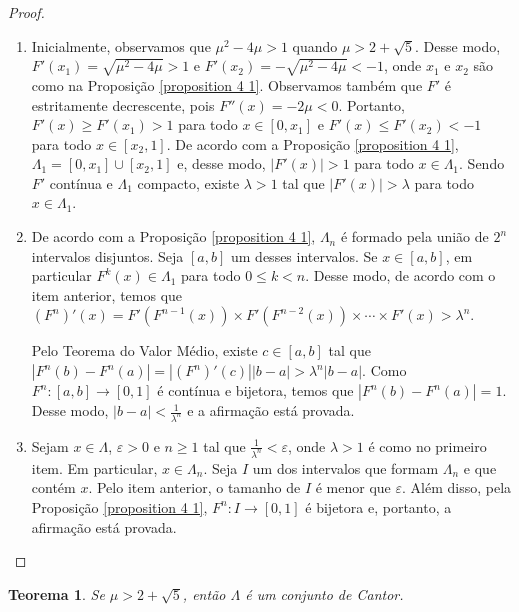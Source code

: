\documentclass[a4paper, 12pt]{article}
\theoremstyle{definition}
\theoremstyle{plain}
\theoremstyle{plain}
\theoremstyle{plain}
\newtheorem{theorem}[definition]{Teorema}
\theoremstyle{definition}
\theoremstyle{remark}
\begin{document}
\begin{proof}
\begin{enumerate}
\item Inicialmente, observamos que $\mu^2 - 4\mu > 1$ quando $\mu > 2 + \sqrt{5}$. Desse modo, $F'(x_1) = \sqrt{\mu^2 - 4\mu} > 1$ e $F'(x_2) = -\sqrt{\mu^2 - 4\mu} < -1$, onde $x_1$ e $x_2$ são como na Proposição \ref{proposition 4 1}. Observamos também que $F'$ é estritamente decrescente, pois $F''(x) = -2\mu < 0$.  Portanto, $F'(x) \geq F'(x_1) > 1$ para todo $x \in [0, x_1]$ e $F'(x) \leq F'(x_2) < -1$ para todo $x \in [x_2, 1]$. De acordo com a Proposição \ref{proposition 4 1}, $\Lambda_1 = [0, x_1] \cup [x_2, 1]$ e, desse modo, $|F'(x)| > 1$ para todo $x \in \Lambda_1$. Sendo $F'$ contínua e $\Lambda_1$ compacto, existe $\lambda > 1$ tal que $|F'(x)| > \lambda$ para todo $x \in \Lambda_1$.

\item De acordo com a Proposição \ref{proposition 4 1}, $\Lambda_n$ é formado pela união de $2^n$ intervalos disjuntos. Seja $[a, b]$ um desses intervalos. Se $x \in [a, b]$, em particular $F^k(x) \in \Lambda_1$ para todo $0 \leq k < n$. Desse modo, de acordo com o item anterior, temos que $(F^n)'(x) = F'(F^{n-1}(x)) \times F'(F^{n-2}(x)) \times \cdots \times F'(x) > \lambda^n$.

Pelo Teorema do Valor Médio, existe $c \in [a, b]$ tal que $|F^n(b) - F^n(a)| = |(F^n)'(c)||b - a| > \lambda^n|b - a|$. Como $F^n: [a, b] \to [0 ,1]$ é contínua e bijetora, temos que $|F^n(b) - F^n(a)| = 1$. Desse modo, $|b - a| < \frac{1}{\lambda^n}$ e a afirmação está provada.

\item  Sejam $x \in \Lambda$, $\varepsilon > 0$ e $n \geq 1$ tal que $\frac{1}{\lambda^n} < \varepsilon$, onde $\lambda > 1$ é como no primeiro item. Em particular, $x \in \Lambda_n$. Seja $I$ um dos intervalos que formam $\Lambda_n$ e que contém $x$. Pelo item anterior, o tamanho de $I$ é menor que $\varepsilon$. Além disso, pela Proposição \ref{proposition 4 1}, $F^n: I \to [0,1]$ é bijetora e, portanto, a afirmação está provada.
\end{enumerate}
\end{proof} 

\begin{theorem}
\label{theorem 4 1}
Se $\mu > 2 + \sqrt{5}$, então $\Lambda$ é um conjunto de Cantor.
\end{theorem}
\end{document}
